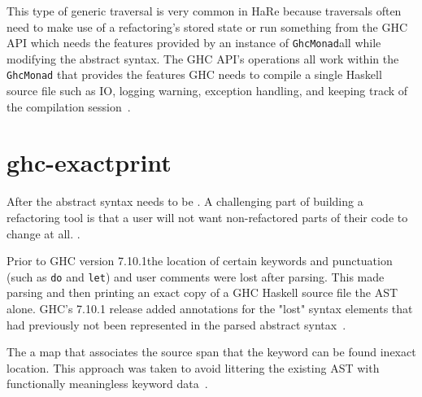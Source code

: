 This type of generic traversal is very common in HaRe because traversals often need to make use of a refactoring's stored state or run something from the GHC API which needs the features provided by an instance of \texttt{GhcMonad}\DIFaddbegin \DIFadd{, }\DIFaddend all while modifying the abstract syntax. The GHC API's operations all work within the \texttt{GhcMonad} that provides the features GHC needs to compile a single Haskell source file such as IO, logging warning, exception handling, and keeping track of the compilation session~\citep{ghcApi}.   

\section{ghc-exactprint}
\label{ghcExactprint}

After \DIFdelbegin {}\DIFdelend \DIFaddbegin {}\DIFaddend the abstract syntax \DIFdelbegin {}\DIFdelend \DIFaddbegin {}\DIFaddend needs to be \DIFdelbegin {}\DIFdelend \DIFaddbegin {}\DIFaddend . A challenging part of building a refactoring tool is that a user will not want non-refactored parts of their code to change at all. \DIFdelbegin {}\DIFdelend \DIFaddbegin {}\DIFaddend . 

Prior to GHC version 7.10.1\DIFaddbegin \DIFadd{, }\DIFaddend the location of certain keywords and punctuation (such as \texttt{do} and \texttt{let}) and user comments were lost after parsing. This made parsing and then printing an exact copy of a GHC Haskell source file \DIFdelbegin {}\DIFdelend \DIFaddbegin {}\DIFaddend the AST alone\DIFdelbegin {}\DIFdelend . GHC's 7.10.1 release added annotations for the "lost" syntax elements that had previously not been represented in the parsed abstract syntax~\citep{apiAnns}. 

The \DIFdelbegin {}\DIFdelend \DIFaddbegin {}\DIFaddend a map that associates \DIFdelbegin {}\DIFdelend \DIFaddbegin {}\DIFaddend the source span that the keyword can be found in\DIFdelbegin {}\DIFdelend \DIFaddbegin {}\DIFaddend exact location. This approach was taken to avoid littering the existing AST with functionally meaningless keyword data~\citep{apiAnns}. 

